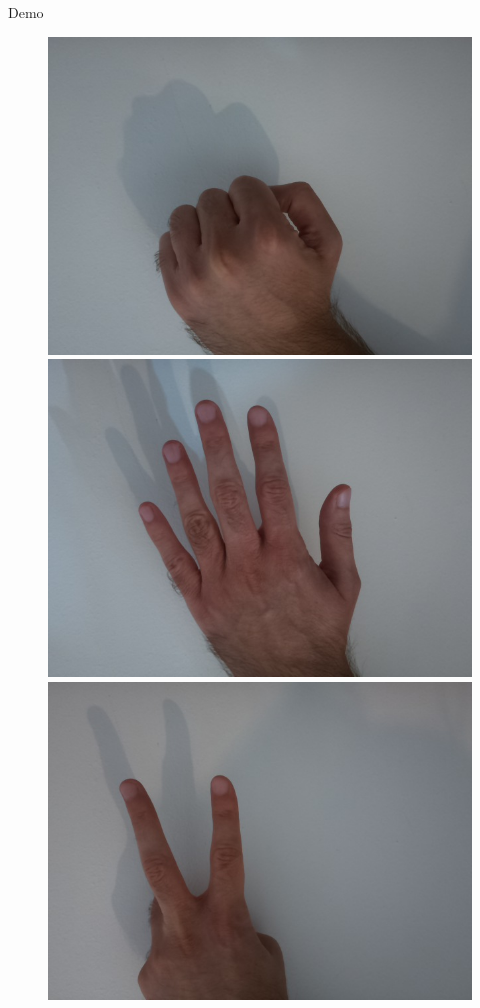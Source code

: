 \begin{frame}{Demo}
  \begin{figure}
	\includegraphics[width=0.33\linewidth,height=0.5\textheight,keepaspectratio]{../images/rock_input.jpeg}%
	\includegraphics[width=0.33\linewidth,height=0.5\textheight,keepaspectratio]{../images/paper_input.jpeg}%
	\includegraphics[width=0.33\linewidth,height=0.5\textheight,keepaspectratio]{../images/scissors_input.jpeg}
  \end{figure}
\end{frame}

